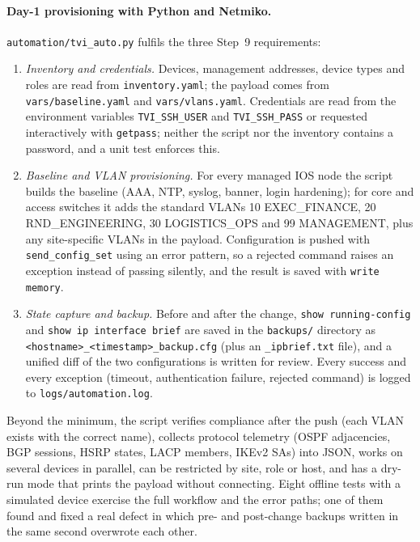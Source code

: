 \documentclass[11pt,a4paper]{article}
\begin{document}
\paragraph{Day-1 provisioning with Python and Netmiko.} \texttt{automation/tvi\_auto.py} fulfils the three Step~9 requirements:
\begin{enumerate}
\item \emph{Inventory and credentials.} Devices, management addresses, device types and roles are read from \texttt{inventory.yaml}; the payload comes from \texttt{vars/baseline.yaml} and \texttt{vars/vlans.yaml}. Credentials are read from the environment variables \texttt{TVI\_SSH\_USER} and \texttt{TVI\_SSH\_PASS} or requested interactively with \texttt{getpass}; neither the script nor the inventory contains a password, and a unit test enforces this.
\item \emph{Baseline and VLAN provisioning.} For every managed IOS node the script builds the baseline (AAA, NTP, syslog, banner, login hardening); for core and access switches it adds the standard VLANs 10 EXEC\_FINANCE, 20 RND\_ENGINEERING, 30 LOGISTICS\_OPS and 99 MANAGEMENT, plus any site-specific VLANs in the payload. Configuration is pushed with \texttt{send\_config\_set} using an error pattern, so a rejected command raises an exception instead of passing silently, and the result is saved with \texttt{write memory}.
\item \emph{State capture and backup.} Before and after the change, \texttt{show running-config} and \texttt{show ip interface brief} are saved in the \texttt{backups/} directory as \texttt{<hostname>\_<timestamp>\_backup.cfg} (plus an \texttt{\_ipbrief.txt} file), and a unified diff of the two configurations is written for review. Every success and every exception (timeout, authentication failure, rejected command) is logged to \texttt{logs/automation.log}.
\end{enumerate}

Beyond the minimum, the script verifies compliance after the push (each VLAN exists with the correct name), collects protocol telemetry (OSPF adjacencies, BGP sessions, HSRP states, LACP members, IKEv2 SAs) into JSON, works on several devices in parallel, can be restricted by site, role or host, and has a dry-run mode that prints the payload without connecting. Eight offline tests with a simulated device exercise the full workflow and the error paths; one of them found and fixed a real defect in which pre- and post-change backups written in the same second overwrote each other.
\end{document}
